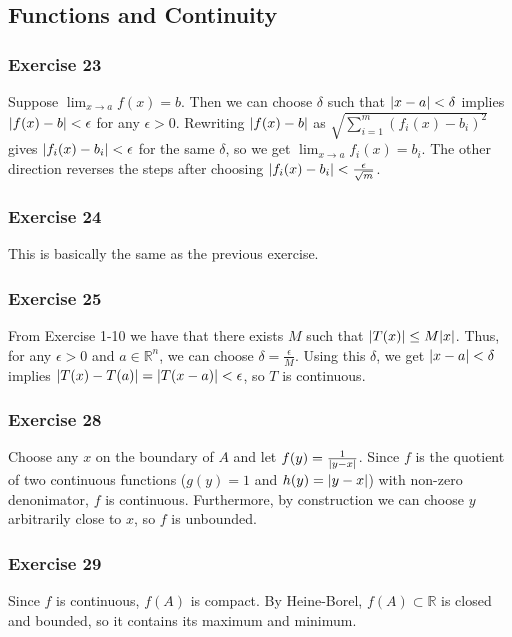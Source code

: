 \subsection{Functions and Continuity}

\subsubsection{Exercise 23}
Suppose $\lim_{x \to a} f(x) = b$. Then we can choose $\delta$ such that $\abs{x - a} < \delta$ implies
$\abs{f(x) - b} < \epsilon$ for any $\epsilon > 0$. Rewriting $\abs{f(x) - b}$ as 
$\sqrt{\sum_{i = 1}^m (f_i (x) - b_i)^2}$ gives $\abs{f_i(x) - b_i} < \epsilon$ for the same $\delta$, so
we get $\lim_{x \to a} f_i(x) = b_i$. The other direction reverses the steps after choosing 
$\abs{f_i(x) - b_i} < \frac{\epsilon}{\sqrt{m}}$. 

\subsubsection{Exercise 24}
This is basically the same as the previous exercise.

\subsubsection{Exercise 25}
From Exercise 1-10 we have that there exists  $M$  such that $\abs{T(x)} \leq M \abs{x}$. Thus, for any
$\epsilon > 0$ and $a \in \mathbb{R}^n$, we can choose $\delta = \frac{\epsilon}{M}$. Using this $\delta$,
we get $\abs{x - a} < \delta$ implies $\abs{T(x) - T(a)} = \abs{T(x - a)} < \epsilon$, so $T$ is continuous.

\subsubsection{Exercise 28}
Choose any $x$ on the boundary of  $A$ and let  $f(y) = \frac{1}{\abs{y - x}}$. Since $f$ is the quotient
of two continuous functions ($g(y) = 1$ and  $h(y) = \abs{y - x}$) with non-zero denonimator, $f$ is continuous.
Furthermore, by construction we can choose  $y$ arbitrarily close to  $x$, so  $f$ is unbounded.

\subsubsection{Exercise 29}
Since $f$ is continuous,  $f(A)$ is compact. By Heine-Borel,  $f(A) \subset \mathbb{R}$ is closed and bounded,
so it contains its maximum and minimum.

